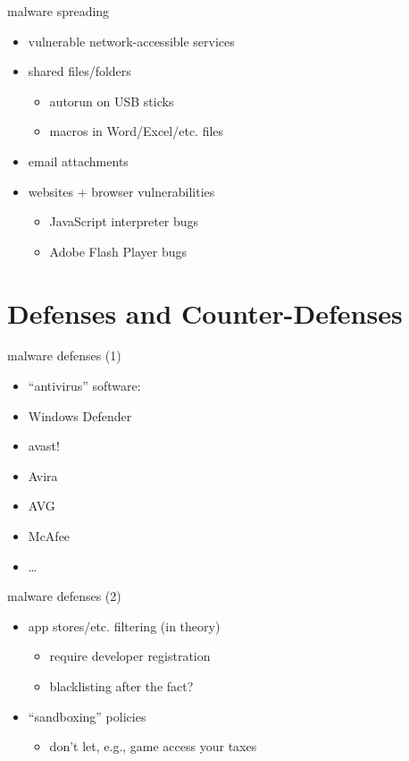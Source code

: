 \begin{frame}{malware spreading}
    \begin{itemize}
        \item vulnerable network-accessible services
        \item shared files/folders  
            \begin{itemize}
            \item autorun on USB sticks
            \item macros in Word/Excel/etc. files
            \end{itemize}
        \item email attachments
        \item websites + browser vulnerabilities
            \begin{itemize}
            \item JavaScript interpreter bugs
            \item Adobe Flash Player bugs
            \end{itemize}
    \end{itemize}
\end{frame}

\section{Defenses and Counter-Defenses}

\begin{frame}{malware defenses (1)}
    \begin{itemize}
        \item ``antivirus'' software:
        \vspace{.5cm}
        \item Windows Defender
        \item avast!
        \item Avira
        \item AVG
        \item McAfee
        \item \ldots
    \end{itemize}
\end{frame}

\begin{frame}{malware defenses (2)}
    \begin{itemize}
        \item app stores/etc. filtering (in theory)
            \begin{itemize}
            \item require developer registration
            \item blacklisting after the fact?
            \end{itemize}
        \item ``sandboxing'' policies
            \begin{itemize}
            \item don't let, e.g., game access your taxes
            \end{itemize}
    \end{itemize}
\end{frame}

